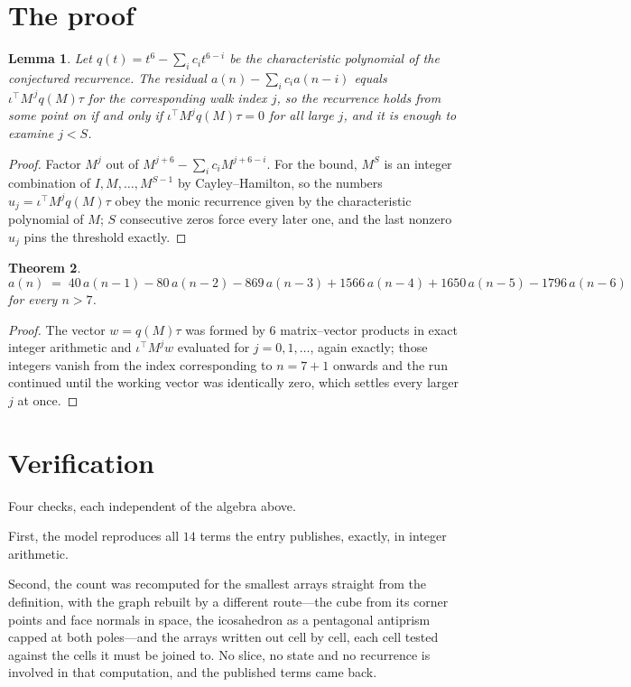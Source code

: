 \documentclass[11pt,a4paper]{article}
\theoremstyle{plain}
\newtheorem{theorem}{Theorem}
\newtheorem{lemma}[theorem]{Lemma}
\theoremstyle{definition}
\begin{document}
\section{The proof}

\begin{lemma}\label{lem:crit}
Let $q(t)=t^{6}-\sum_i c_it^{6-i}$ be the characteristic polynomial of the
conjectured recurrence. The residual $a(n)-\sum_ic_ia(n-i)$ equals
$\iota^{\!\top}M^{\,j}q(M)\tau$ for the corresponding walk index $j$, so the recurrence
holds from some point on if and only if $\iota^{\!\top}M^{j}q(M)\tau=0$ for all large $j$,
and it is enough to examine $j<S$.
\end{lemma}

\begin{proof}
Factor $M^{j}$ out of $M^{j+6}-\sum_ic_iM^{j+6-i}$. For the bound, $M^{S}$
is an integer combination of $I,M,\dots,M^{S-1}$ by Cayley--Hamilton, so the numbers
$u_j=\iota^{\!\top}M^{j}q(M)\tau$ obey the monic recurrence given by the characteristic
polynomial of $M$; $S$ consecutive zeros force every later one, and the last nonzero $u_j$
pins the threshold exactly.
\end{proof}

\begin{theorem}
\[
a(n)\;=\;40\,a(n-1) - 80\,a(n-2) - 869\,a(n-3) + 1566\,a(n-4) + 1650\,a(n-5) - 1796\,a(n-6)
\]
for every $n>7$.
\end{theorem}

\begin{proof}
The vector $w=q(M)\tau$ was formed by $6$ matrix--vector products in exact integer
arithmetic and $\iota^{\!\top}M^{j}w$ evaluated for $j=0,1,\dots$, again exactly; those
integers vanish from the index corresponding to $n=7+1$ onwards and the run continued
until the working vector was identically zero, which settles every larger $j$ at once.
\end{proof}

\section{Verification}

Four checks, each independent of the algebra above.

First, the model reproduces all $14$ terms the entry publishes, exactly, in integer
arithmetic.

Second, the count was recomputed for the smallest arrays straight from the definition, with the
graph rebuilt by a different route---the cube from its corner points and face normals in space,
the icosahedron as a pentagonal antiprism capped at both poles---and the arrays written out cell
by cell, each cell tested against the cells it must be joined to. No slice, no state and no
recurrence is involved in that computation, and the published terms came back.
\end{document}
